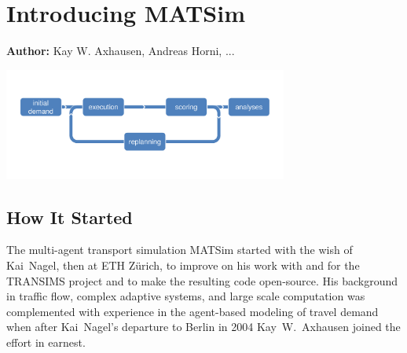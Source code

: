 \chapter{Introducing MATSim}
\label{ch:introducing}
\hfill \textbf{Author:} Kay W. Axhausen, Andreas Horni, ...

\begin{center} \includegraphics[width=0.7\textwidth, angle=0]{figures/matsimcycle.pdf} \end{center}



\section{How It Started}
The multi-\gls{agent} transport simulation MATSim \citep[][]{MATSIM-T_Webpage_2014} started with the wish of Kai~Nagel, then at ETH Zürich, to improve on his work with and for the TRANSIMS project \citep[][]{SmithEtAl_NTRPAC_1995} and to make the resulting code open-source. His background in traffic flow, complex adaptive systems, and large scale computation was complemented with experience in the agent-based modeling of travel demand when after Kai~Nagel's departure to Berlin in 2004 Kay~W.~Axhausen joined the effort in earnest. 

